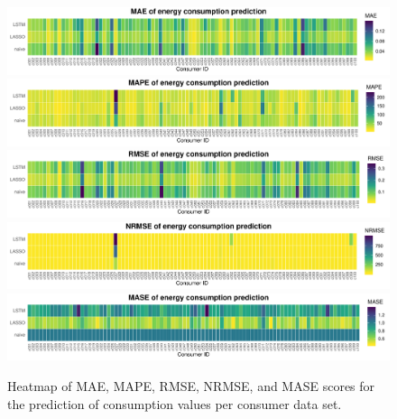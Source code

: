 %
\begin{figure}[htbp]
 \centering
 \includegraphics[width=\textwidth]{thesis/graphs/evaluation/c_heatmap_MAE.pdf}
 \includegraphics[width=\textwidth]{thesis/graphs/evaluation/c_heatmap_MAPE.pdf}
 \includegraphics[width=\textwidth]{thesis/graphs/evaluation/c_heatmap_RMSE.pdf}
 \includegraphics[width=\textwidth]{thesis/graphs/evaluation/c_heatmap_NRMSE.pdf}
 \includegraphics[width=\textwidth]{thesis/graphs/evaluation/c_heatmap_MASE.pdf}
\caption[Heatmaps of all error measures for consumption values]{Heatmap of MAE, MAPE, RMSE, NRMSE, and MASE scores for the prediction of consumption values per consumer data set. \quantnet\href{ }{}}
\label{Fig:heatmaps}
\end{figure}
%

